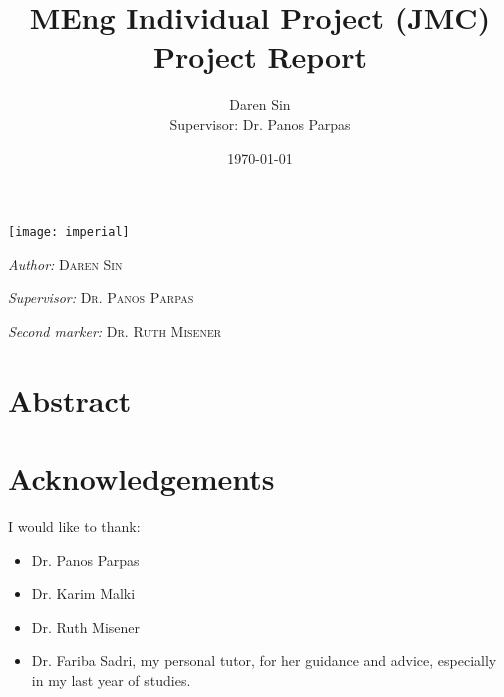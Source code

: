 \documentclass[12pt, twoside, a4paper]{report}
\title{MEng Individual Project (JMC) \\ Project Report}
\author{Daren Sin \\  Supervisor: Dr. Panos Parpas}
\date{\today}
\begin{document}
\begin{titlingpage}

\vspace*{4cm}

\begin{center}
\texttt{[image: imperial]}
\end{center}

\vspace{3cm}

\begin{center}
\LARGE \textsc{\thetitle}
\end{center}

\vspace{2cm}

\begin{center}
\Large \textit{Author:} \textsc{Daren Sin}

\textit{Supervisor:} \textsc{Dr. Panos Parpas}

\textit{Second marker:} \textsc{Dr. Ruth Misener}
\end{center}

\vspace{4cm}

\begin{center}
\large \textsc{\thedate}
\end{center}





\end{titlingpage}








\chapter*{Abstract}

\chapter*{Acknowledgements}

I would like to thank:
\begin{itemize}
  \item Dr. Panos Parpas
  \item Dr. Karim Malki
  \item Dr. Ruth Misener
  \item Dr. Fariba Sadri, my personal tutor, for her guidance and advice, especially in my last year of studies.
\end{itemize}
\end{document}
